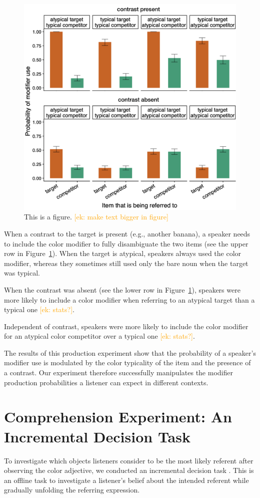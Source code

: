 \documentclass[10pt,letterpaper]{article}
\newcommand{\ek}[1]{\textcolor{Orange}{[ek: #1]}}
\begin{document}
\begin{figure}
	\begin{center}
		\includegraphics[width=.45\textwidth]{graphs/prod-bycond-paper.pdf}
	\end{center}
\caption{This is a figure. \ek{make text bigger in figure}} 
\label{prod-results}
\end{figure}

When a contrast to the target is present (e.g., another banana), a speaker needs to include the color modifier to fully disambiguate the two items (see the upper row in Figure~\ref{prod-results}). When the target is atypical, speakers always used the color modifier, whereas they sometimes still used only the bare noun when the target was typical.

When the contrast was absent (see the lower row in Figure~\ref{prod-results}), speakers were more likely to include a color modifier when referring to an atypical target than a typical one \ek{stats?}.

Independent of contrast, speakers were more likely to include the color modifier for an atypical color competitor over a typical one \ek{stats?}.

The results of this production experiment show that the probability of a speaker's modifier use is modulated by the color typicality of the item and the presence of a contrast. Our experiment therefore successfully manipulates the modifier production probabilities a listener can expect in different contexts.


\section{Comprehension Experiment: An Incremental Decision Task}
To investigate which objects listeners consider to be the most likely referent after observing the color adjective, we conducted an incremental decision task \cite{Qing:2018}. This is an offline task to investigate a listener's belief about the intended referent while gradually unfolding the referring expression.
\end{document}
